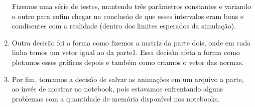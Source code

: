 \documentclass[12pt, a4paper, oneside]{article}
\begin{document}
\begin{enumerate}
Fizemos uma série de testes, mantendo três parâmetros constantes e variando o
outro para enfim chegar na conclusão de que esses intervalos eram bons e 
condisentes com a realidade (dentro dos limites esperados da simulação).

\item Outra decisão foi a forma como fizemos a matriz da parte dois, onde em 
cada linha temos um vetor igual ao da parte1. Essa decisão afeta a forma como 
plotamos esses gráficos depois e também como criamos o vetor das normas.

\item Por fim, tomamos a decisão de salvar as animações em um arquivo a parte, ao
invés de mostrar no notebook, pois estavamos enfrentando alguns problemas com 
a quantidade de memória disponível nos notebooks.
\end{enumerate}



\end{document}

